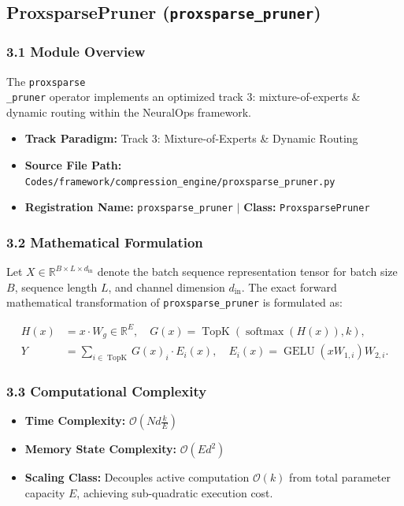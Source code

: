 \subsection{ProxsparsePruner (\texttt{proxsparse\_pruner})}
\label{sec:app_module_proxsparse_pruner}

\subsubsection*{3.1 Module Overview}
The \texttt{proxsparse\\_pruner} operator implements an optimized track 3: mixture-of-experts \& dynamic routing within the NeuralOps framework.
\begin{itemize}
    \item \textbf{Track Paradigm:} Track 3: Mixture-of-Experts & Dynamic Routing
    \item \textbf{Source File Path:} \texttt{Codes/framework/compression\_engine/proxsparse\_pruner.py}
    \item \textbf{Registration Name:} \texttt{proxsparse\_pruner} $\mid$ \textbf{Class:} \texttt{ProxsparsePruner}
\end{itemize}

\subsubsection*{3.2 Mathematical Formulation}
Let $X \in \mathbb{R}^{B \times L \times d_{\text{in}}}$ denote the batch sequence representation tensor for batch size $B$, sequence length $L$, and channel dimension $d_{\text{in}}$. The exact forward mathematical transformation of \texttt{proxsparse\_pruner} is formulated as:

\begin{align}
H(x) &= x \cdot W_g \in \mathbb{R}^{E}, \quad G(x) = \operatorname{TopK}\left(\operatorname{softmax}(H(x)), k\right), \\
Y &= \sum_{i \in \operatorname{TopK}} G(x)_i \cdot E_i(x), \quad E_i(x) = \operatorname{GELU}(x W_{1, i}) W_{2, i}.
\end{align}


\subsubsection*{3.3 Computational Complexity}
\begin{itemize}
    \item \textbf{Time Complexity:} $\mathcal{O}(N d \frac{k}{E})$
    \item \textbf{Memory State Complexity:} $\mathcal{O}(E d^2)$
    \item \textbf{Scaling Class:} Decouples active computation $\mathcal{O}(k)$ from total parameter capacity $E$, achieving sub-quadratic execution cost.
\end{itemize}

